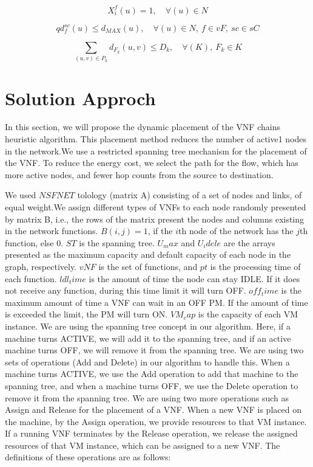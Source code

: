 \documentclass[12pt]{article}
\begin{document}
\begin{equation}
X_i^f(u)=1,\quad \forall (u) \in N
\end{equation}

\begin{equation}
qd_f^{sc}(u)\leq d_{MAX}(u),\quad \forall (u) \in N,\ f \in vF,\ sc \in sC
\end{equation}

\begin{equation}
\sum_{(u,v) \in P_k}d_{F_k}(u,v)\leq D_k,\quad \forall (K) ,\   F_k \in K
\end{equation}

\section{Solution Approch}
In this section, we will propose the dynamic placement of
the VNF chains heuristic algorithm. This placement method
reduces the number of active1 nodes in the network.We use a
restricted spanning tree mechanism for the placement of the
VNF. To reduce the energy cost, we select the path for the
flow, which has more active nodes, and fewer hop counts from
the source to destination. 

We  used $NSFNET$ tolology  (matrix A)
consisting of a set of nodes and links, of equal weight.We
assign different types of VNFs to each node randomly
presented by matrix B, i.e., the rows of the matrix present the
nodes and columns existing in the network functions.
$B(i,j)=1$, if the $i$th node of the network has the $j$th function,
else 0. $ST$ is the spanning tree. $U_max$ and $U_idele$ are the arrays
presented as the maximum capacity and default capacity of
each node in the graph, respectively. $vNF$ is the set of
functions, and $pt$ is the processing time of each function.
$ldl_time$ is the amount of time the node can stay IDLE. If it
does not receive any function, during this time limit it will
turn OFF. $off_time$ is the maximum amount of time a VNF can
wait in an OFF PM. If the amount of time is exceeded the
limit, the PM will turn ON. $VM_cap$ is the capacity of each VM
instance. We are using the spanning tree concept in our
algorithm. Here, if a machine turns ACTIVE, we will add it to
the spanning tree, and if an active machine turns OFF, we will
remove it from the spanning tree. We are using two sets of
operations (Add and Delete) in our algorithm to handle this.
When a machine turns ACTIVE, we use the Add operation to
add that machine to the spanning tree, and when a machine
turns OFF, we use the Delete operation to remove it from the
spanning tree. We are using two more operations such as
Assign and Release for the placement of a VNF. When a new
VNF is placed on the machine, by the Assign operation, we
provide resources to that VM instance. If a running VNF
terminates by the Release operation, we release the assigned
resources of that VM instance, which can be assigned to a new
VNF. The definitions of these operations are as follows:
\end{document}
